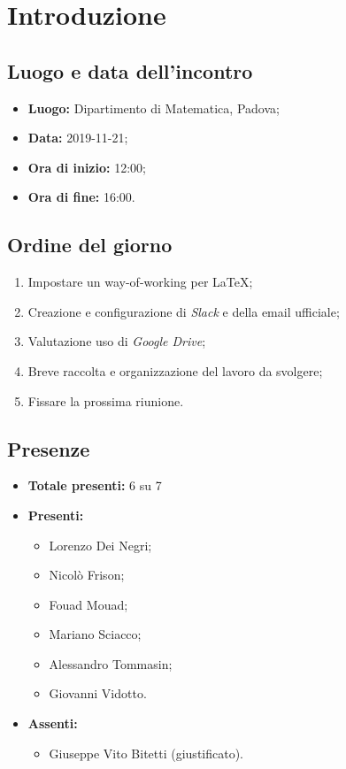 \section*{Introduzione}

\subsection*{Luogo e data dell'incontro}
	\begin{itemize}
		\item \textbf{Luogo:} Dipartimento di Matematica, Padova;
		\item \textbf{Data:} 2019-11-21;
		\item \textbf{Ora di inizio:} 12:00;
		\item \textbf{Ora di fine:} 16:00.
	\end{itemize}

\subsection*{Ordine del giorno}
	\begin{enumerate}
		\item Impostare un way-of-working per \LaTeX{};
		\item Creazione e configurazione di \textit{Slack} e della email ufficiale;
		\item Valutazione uso di \textit{Google Drive};
		\item Breve raccolta e organizzazione del lavoro da svolgere;
		\item Fissare la prossima riunione.
	\end{enumerate}

\subsection*{Presenze}
	\begin{itemize}
		\item \textbf{Totale presenti:} 6 su 7
		\item \textbf{Presenti: }
			\begin{itemize}			
				\item Lorenzo Dei Negri;
				\item Nicolò Frison;
				\item Fouad Mouad;
				\item Mariano Sciacco;
				\item Alessandro Tommasin;
				\item Giovanni Vidotto.
			\end{itemize}
		\item \textbf{Assenti: } 
			\begin{itemize}	
				\item Giuseppe Vito Bitetti (giustificato).
			\end{itemize}
	\end{itemize}


